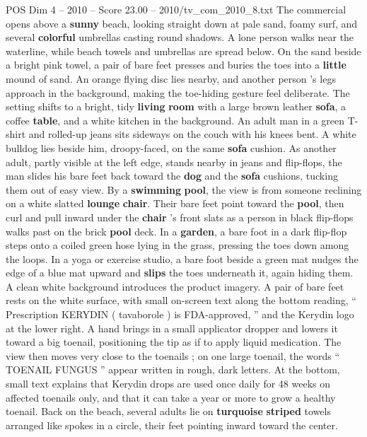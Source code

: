 \begin{textsample}{POS Dim 4 – 2010 – Score 23.00 – 2010/tv\_com\_2010\_8.txt}  \label{ex:f4_pos_022}
The commercial opens above a \textbf{sunny} beach, looking straight down at pale sand, foamy surf, and several \textbf{colorful} umbrellas casting round shadows.
A lone person walks near the waterline, while beach towels and umbrellas are spread below.
On the sand beside a bright pink towel, a pair of bare feet presses and buries the toes into a \textbf{little} mound of sand.
An orange flying disc lies nearby, and another person ’s legs approach in the background, making the toe-hiding gesture feel deliberate.
The setting shifts to a bright, tidy \textbf{living} \textbf{room} with a large brown leather \textbf{sofa}, a coffee \textbf{table}, and a white kitchen in the background.
An adult man in a green T-shirt and rolled-up jeans sits sideways on the couch with his knees bent.
A white bulldog lies beside him, droopy-faced, on the same \textbf{sofa} cushion.
As another adult, partly visible at the left edge, stands nearby in jeans and flip-flops, the man slides his bare feet back toward the \textbf{dog} and the \textbf{sofa} cushions, tucking them out of easy view.
By a \textbf{swimming} \textbf{pool}, the view is from someone reclining on a white slatted \textbf{lounge} \textbf{chair}.
Their bare feet point toward the \textbf{pool}, then curl and pull inward under the \textbf{chair} ’s front slats as a person in black flip-flops walks past on the brick \textbf{pool} deck.
In a \textbf{garden}, a bare foot in a dark flip-flop steps onto a coiled green hose lying in the grass, pressing the toes down among the loops.
In a yoga or exercise studio, a bare foot beside a green mat nudges the edge of a blue mat upward and \textbf{slips} the toes underneath it, again hiding them.
A clean white background introduces the product imagery.
A pair of bare feet rests on the white surface, with small on-screen text along the bottom reading, “ Prescription KERYDIN ( tavaborole ) is FDA-approved, ” and the Kerydin logo at the lower right.
A hand brings in a small applicator dropper and lowers it toward a big toenail, positioning the tip as if to apply liquid medication.
The view then moves very close to the toenails ; on one large toenail, the words “ TOENAIL FUNGUS ” appear written in rough, dark letters.
At the bottom, small text explains that Kerydin drops are used once daily for 48 weeks on affected toenails only, and that it can take a year or more to grow a healthy toenail.
Back on the beach, several adults lie on \textbf{turquoise} \textbf{striped} towels arranged like spokes in a circle, their feet pointing inward toward the center.

\end{textsample}
